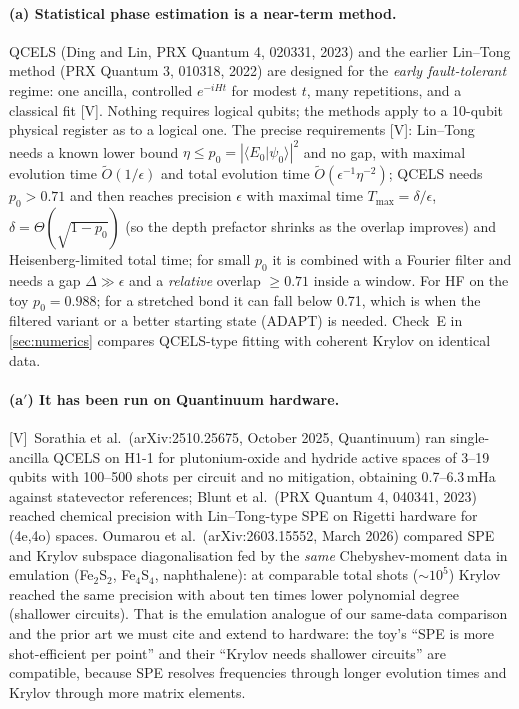 \documentclass[11pt,a4paper]{article}
\newcommand{\braket}[2]{\langle #1\vert #2\rangle}
\newcommand{\lV}{\textcolor{keyblue}{[V]}}   %
\begin{document}
\paragraph{(a) Statistical phase estimation is a near-term method.}
QCELS (Ding and Lin, PRX Quantum 4, 020331, 2023) and the earlier Lin--Tong method (PRX Quantum 3, 010318, 2022) are designed for the \emph{early fault-tolerant} regime: one ancilla, controlled $e^{-iHt}$ for modest $t$, many repetitions, and a classical fit \lV. Nothing requires logical qubits; the methods apply to a 10-qubit physical register as to a logical one. The precise requirements \lV: Lin--Tong needs a known lower bound $\eta\le p_0=|\braket{E_0}{\psi_0}|^2$ and no gap, with maximal evolution time $\tilde O(1/\epsilon)$ and total evolution time $\tilde O(\epsilon^{-1}\eta^{-2})$; QCELS needs $p_0>0.71$ and then reaches precision $\epsilon$ with maximal time $T_{\max}=\delta/\epsilon$, $\delta=\Theta(\sqrt{1-p_0})$ (so the depth prefactor shrinks as the overlap improves) and Heisenberg-limited total time; for small $p_0$ it is combined with a Fourier filter and needs a gap $\Delta\gg\epsilon$ and a \emph{relative} overlap $\ge0.71$ inside a window. For HF on the toy $p_0=0.988$; for a stretched bond it can fall below 0.71, which is when the filtered variant or a better starting state (ADAPT) is needed. Check~E in \cref{sec:numerics} compares QCELS-type fitting with coherent Krylov on identical data.

\paragraph{(a$'$) It has been run on Quantinuum hardware.}
\lV\ Sorathia et al.\ (arXiv:2510.25675, October 2025, Quantinuum) ran single-ancilla QCELS on H1-1 for plutonium-oxide and hydride active spaces of 3--19 qubits with 100--500 shots per circuit and no mitigation, obtaining 0.7--6.3\,mHa against statevector references; Blunt et al.\ (PRX Quantum 4, 040341, 2023) reached chemical precision with Lin--Tong-type SPE on Rigetti hardware for (4e,4o) spaces. Oumarou et al.\ (arXiv:2603.15552, March 2026) compared SPE and Krylov subspace diagonalisation fed by the \emph{same} Chebyshev-moment data in emulation (Fe$_2$S$_2$, Fe$_4$S$_4$, naphthalene): at comparable total shots ($\sim10^5$) Krylov reached the same precision with about ten times lower polynomial degree (shallower circuits). That is the emulation analogue of our same-data comparison and the prior art we must cite and extend to hardware: the toy's ``SPE is more shot-efficient per point'' and their ``Krylov needs shallower circuits'' are compatible, because SPE resolves frequencies through longer evolution times and Krylov through more matrix elements.
\end{document}
